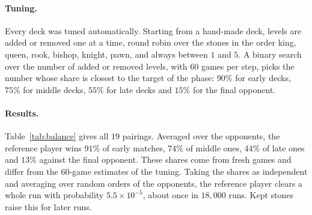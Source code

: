 \documentclass[11pt,a4paper]{article}
\begin{document}
\paragraph{Tuning.} Every deck was tuned automatically. Starting from a hand-made deck, levels are added or removed one at a time, round robin over the stones in the order king, queen, rook, bishop, knight, pawn, and always between $1$ and $5$. A binary search over the number of added or removed levels, with $60$ games per step, picks the number whose share is closest to the target of the phase: $90\%$ for early decks, $75\%$ for middle decks, $55\%$ for late decks and $15\%$ for the final opponent.

\paragraph{Results.} Table~\ref{tab:balance} gives all $19$ pairings. Averaged over the opponents, the reference player wins $91\%$ of early matches, $74\%$ of middle ones, $44\%$ of late ones and $13\%$ against the final opponent. These shares come from fresh games and differ from the $60$-game estimates of the tuning. Taking the shares as independent and averaging over random orders of the opponents, the reference player clears a whole run with probability $5.5\times10^{-5}$, about once in $18{,}000$ runs. Kept stones raise this for later runs.
\end{document}
